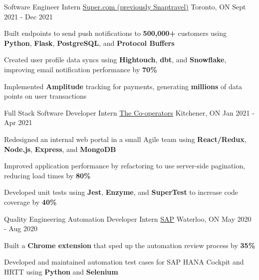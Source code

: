 \begin{cventries}
  \cventry
    {Software Engineer Intern} %
    {\href{https://www.super.com/}{Super.com (previously Snaptravel)}} %
    {Toronto, ON} %
    {Sept 2021 - Dec 2021} %
    {
      \begin{cvitems} %
      \item {Built endpoints to send push notifications to \textbf{500,000+} customers using \textbf{Python}, \textbf{Flask}, \textbf{PostgreSQL}, and \textbf{Protocol Buffers}}
      \item {Created user profile data syncs using \textbf{Hightouch}, \textbf{dbt}, and \textbf{Snowflake}, improving email notification performance by \textbf{70\%}}
      \item {Implemented \textbf{Amplitude} tracking for payments, generating \textbf{millions} of data points on user transactions}
      \end{cvitems}
    }

  \cventry
    {Full Stack Software Developer Intern} %
    {\href{https://www.cooperators.ca/}{The Co-operators}} %
    {Kitchener, ON} %
    {Jan 2021 - Apr 2021} %
    {
      \begin{cvitems} %
      \item {Redesigned an internal web portal in a small Agile team using \textbf{React/Redux}, \textbf{Node.js}, \textbf{Express}, and \textbf{MongoDB}}
      \item {Improved application performance by refactoring to use server-side pagination, reducing load times by \textbf{80\%}}
      \item {Developed unit tests using \textbf{Jest}, \textbf{Enzyme}, and \textbf{SuperTest} to increase code coverage by \textbf{40\%}}
      \end{cvitems}
    }
    
  \cventry
    {Quality Engineering Automation Developer Intern} %
    {\href{https://www.sap.com/canada/index.html}{SAP}} %
    {Waterloo, ON} %
    {May 2020 - Aug 2020} %
    {
      \begin{cvitems} %
      \item {Built a \textbf{Chrome extension} that sped up the automation review process by \textbf{35\%}}
      \item {Developed and maintained automation test cases for SAP HANA Cockpit and HRTT using \textbf{Python} and \textbf{Selenium}}
      \end{cvitems}
    }
       
\end{cventries}
